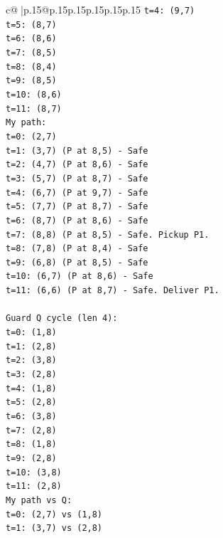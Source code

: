 \documentclass{article}
\begin{document}
{\begin{supertabular}{c@{$\;$}|p{.15\linewidth}@{}p{.15\linewidth}p{.15\linewidth}p{.15\linewidth}p{.15\linewidth}p{.15\linewidth}}
{{{\texttt{t=4: (9,7)} \\
\texttt{t=5: (8,7)} \\
\texttt{t=6: (8,6)} \\
\texttt{t=7: (8,5)} \\
\texttt{t=8: (8,4)} \\
\texttt{t=9: (8,5)} \\
\texttt{t=10: (8,6)} \\
\texttt{t=11: (8,7)} \\
\texttt{My path:} \\
\texttt{t=0: (2,7)} \\
\texttt{t=1: (3,7) (P at 8,5) {-} Safe} \\
\texttt{t=2: (4,7) (P at 8,6) {-} Safe} \\
\texttt{t=3: (5,7) (P at 8,7) {-} Safe} \\
\texttt{t=4: (6,7) (P at 9,7) {-} Safe} \\
\texttt{t=5: (7,7) (P at 8,7) {-} Safe} \\
\texttt{t=6: (8,7) (P at 8,6) {-} Safe} \\
\texttt{t=7: (8,8) (P at 8,5) {-} Safe. Pickup P1.} \\
\texttt{t=8: (7,8) (P at 8,4) {-} Safe} \\
\texttt{t=9: (6,8) (P at 8,5) {-} Safe} \\
\texttt{t=10: (6,7) (P at 8,6) {-} Safe} \\
\texttt{t=11: (6,6) (P at 8,7) {-} Safe. Deliver P1.} \\
\\ 
\texttt{Guard Q cycle (len 4):} \\
\texttt{t=0: (1,8)} \\
\texttt{t=1: (2,8)} \\
\texttt{t=2: (3,8)} \\
\texttt{t=3: (2,8)} \\
\texttt{t=4: (1,8)} \\
\texttt{t=5: (2,8)} \\
\texttt{t=6: (3,8)} \\
\texttt{t=7: (2,8)} \\
\texttt{t=8: (1,8)} \\
\texttt{t=9: (2,8)} \\
\texttt{t=10: (3,8)} \\
\texttt{t=11: (2,8)} \\
\texttt{My path vs Q:} \\
\texttt{t=0: (2,7) vs (1,8)} \\
\texttt{t=1: (3,7) vs (2,8)} \\
}}}
\end{supertabular}}
\end{document}
